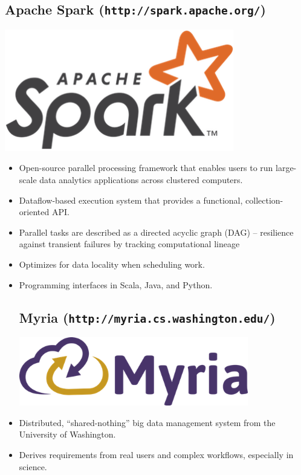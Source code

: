 \documentclass[a0,landscape]{a0poster}
\begin{document}
\begin{multicols}{3}
\subsection*{Apache Spark (\texttt{http://spark.apache.org/})}
\includegraphics[width=10cm]{spark-logo.png}
\begin{itemize}
\item Open-source parallel processing framework that enables users
to run large-scale data analytics applications across clustered computers.

\item Dataflow-based execution system that provides a functional,
collection-oriented API.

\item Parallel tasks are described as a directed acyclic graph (DAG) --
resilience against transient failures by tracking computational lineage

\item Optimizes for data locality when scheduling work.

\item Programming interfaces in Scala, Java, and Python.

\subsection*{Myria (\texttt{http://myria.cs.washington.edu/})}
\includegraphics[width=10cm]{myria-logo.png}

\item Distributed, ``shared-nothing'' big data management system from the
University of Washington.

\item Derives requirements from real users and complex
workflows, especially in science.


\end{itemize}
\end{multicols}
\end{document}
